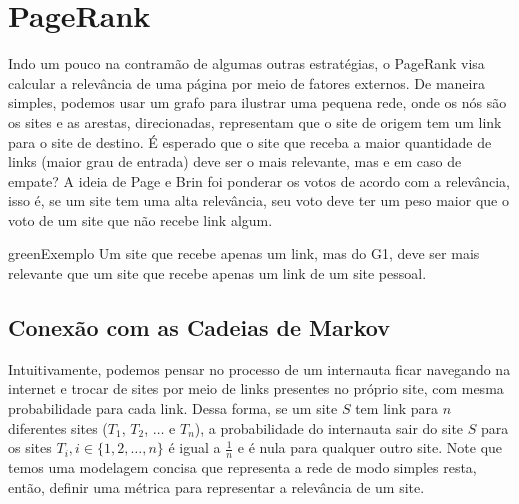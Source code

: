 \documentclass{article}
\begin{document}

\section*{PageRank}

Indo um pouco na contramão de algumas outras estratégias, o PageRank visa calcular a relevância de uma página por meio de fatores externos. De maneira simples, podemos usar um grafo para ilustrar uma pequena rede, onde os nós são os sites e as arestas, direcionadas, representam que o site de origem tem um link para o site de destino. É esperado que o site que receba a maior quantidade de links (maior grau de entrada) deve ser o mais relevante, mas e em caso de empate? A ideia de Page e Brin foi ponderar os votos de acordo com a relevância, isso é, se um site tem uma alta relevância, seu voto deve ter um peso maior que o voto de um site que não recebe link algum.
\begin{mybox}{green}{Exemplo}
    Um site que recebe apenas um link, mas do G1, deve ser mais relevante que um site que recebe apenas um link de um site pessoal.
\end{mybox}


\subsection*{Conexão com as Cadeias de Markov}

Intuitivamente, podemos pensar no processo de um internauta ficar navegando na internet e trocar de sites por meio de links presentes no próprio site, com mesma probabilidade para cada link. Dessa forma, se um site $S$ tem link para $n$ diferentes sites ($T_1$, $T_2$, $\dots$ e $T_n$), a probabilidade do internauta sair do site $S$ para os sites $T_i, i \in \{1, 2, \dots, n\}$ é igual a $\frac{1}{n}$ e é nula para qualquer outro site. Note que temos uma modelagem concisa que representa a rede de modo simples resta, então, definir uma métrica para representar a relevância de um site.
\end{document}
